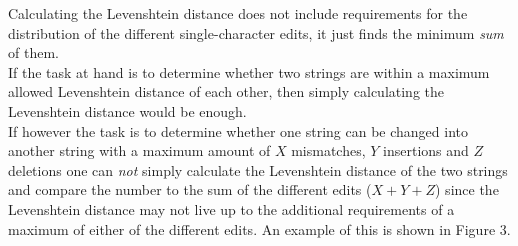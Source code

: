 \documentclass[12pt]{article}
\begin{document}
\noindent Calculating the Levenshtein distance does not include requirements for the distribution of the different 
single-character edits, it just finds the minimum \textit{sum} of them. \\
If the task at hand is to determine whether two strings are within a maximum allowed Levenshtein distance of each other,
then simply calculating the Levenshtein distance would be enough. \\
If however the task is to determine whether one string can be changed into another string with a maximum amount of $X$  mismatches, $Y$ insertions and $Z$ deletions one can \textit{not} simply calculate the Levenshtein distance of the two
strings and compare the number to the sum of the different edits ($X+Y+Z$) since the Levenshtein distance may not live
up to the additional requirements of a maximum of either of the different edits. An example of this is shown in Figure 3. \\
\end{document}
